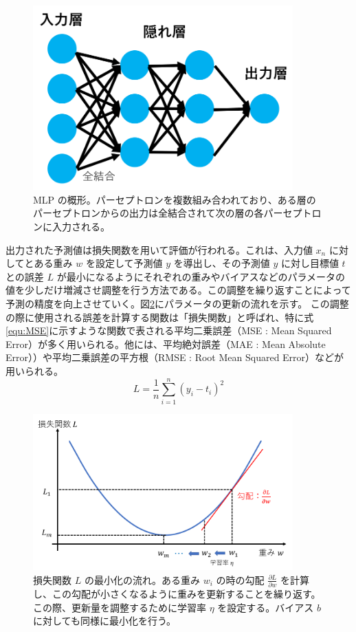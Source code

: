 \begin{figure}[tb]
  \centering
  \includegraphics[clip, width=10cm]{fig/4/MLP_re.png}
  \caption{MLP の概形。パーセプトロンを複数組み合われており、ある層のパーセプトロンからの出力は全結合されて次の層の各パーセプトロンに入力される。}
  \label{fig:MLP}
\end{figure}

出力された予測値は損失関数を用いて評価が行われる。これは、入力値 $x_n$ に対してとある重み $w$ を設定して予測値 $y$ を導出し、その予測値 $y$ に対し目標値 $t$ との誤差 $L$ が最小になるようにそれぞれの重みやバイアスなどのパラメータの値を少しだけ増減させ調整を行う方法である。この調整を繰り返すことによって予測の精度を向上させていく。図\ref{fig:lossfunction}にパラメータの更新の流れを示す。
この調整の際に使用される誤差を計算する関数は「損失関数」と呼ばれ、特に式\eqref{equ:MSE}に示すような関数で表される平均二乗誤差（MSE : Mean Squared Error）が多く用いられる。他には、平均絶対誤差（MAE : Mean Absolute Error））や平均二乗誤差の平方根（RMSE : Root Mean Squared Error）などが用いられる。
\begin{equation}
    L = \frac{1}{n}\sum^{n}_{i=1}(y_i-t_i)^2
    \label{equ:MSE}
\end{equation}

\begin{figure}[tb]
  \centering
  \includegraphics[clip, width=10cm]{fig/4/lossfunc_laerning.png}
  \caption{損失関数 $L$ の最小化の流れ。ある重み $w_i$ の時の勾配 $\frac{\partial L}{\partial w}$ を計算し、この勾配が小さくなるように重みを更新することを繰り返す。この際、更新量を調整するために学習率 $\eta$ を設定する。バイアス $b$ に対しても同様に最小化を行う。}
  \label{fig:lossfunction}
\end{figure}

